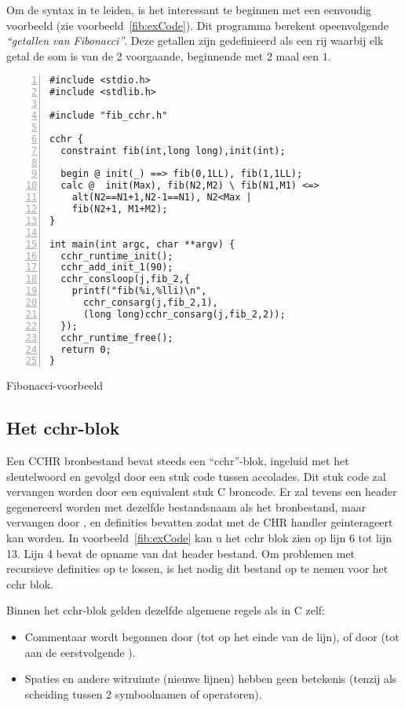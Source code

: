 Om de syntax in te leiden, is het interessant te beginnen met een eenvoudig voorbeeld (zie voorbeeld~\ref{fib:exCode}). Dit programma berekent opeenvolgende {\em ``getallen van Fibonacci''}. Deze getallen zijn gedefinieerd als een rij waarbij elk getal de som is van de 2 voorgaande, beginnende met 2 maal een $1$.

\begin{exCode}
\begin{Verbatim}[frame=single,numbers=left]
#include <stdio.h>
#include <stdlib.h>

#include "fib_cchr.h"

cchr {
  constraint fib(int,long long),init(int);

  begin @ init(_) ==> fib(0,1LL), fib(1,1LL);
  calc @  init(Max), fib(N2,M2) \ fib(N1,M1) <=>
    alt(N2==N1+1,N2-1==N1), N2<Max |
    fib(N2+1, M1+M2);
}

int main(int argc, char **argv) {
  cchr_runtime_init();
  cchr_add_init_1(90);
  cchr_consloop(j,fib_2,{
    printf("fib(%i,%lli)\n", 
      cchr_consarg(j,fib_2,1),
      (long long)cchr_consarg(j,fib_2,2));
  });
  cchr_runtime_free();
  return 0;
}
\end{Verbatim}
\caption{\label{fib:exCode} Fibonacci-voorbeeld}
\end{exCode}

\subsection{Het cchr-blok}

Een CCHR bronbestand bevat steeds een ``cchr''-blok, ingeluid met het sleutelwoord  en gevolgd door een stuk code tussen accolades. Dit stuk code zal vervangen worden door een equivalent stuk C broncode. Er zal tevens een header gegenereerd worden met dezelfde bestandsnaam als het bronbestand, maar  vervangen door , en definities bevatten zodat met de CHR handler geinterageert kan worden. In voorbeeld~\ref{fib:exCode} kan u het cchr blok zien op lijn 6 tot lijn 13. Lijn 4 bevat de opname van dat header bestand. Om problemen met recursieve definities op te lossen, is het nodig dit bestand op te nemen voor het cchr blok.

Binnen het cchr-blok gelden dezelfde algemene regels als in C zelf: \begin{itemize}
  \item Commentaar wordt begonnen door \code{//} (tot op het einde van de lijn), of door \code{/*} (tot aan de eerstvolgende \code{*/}).
  \item Spaties en andere witruimte (nieuwe lijnen) hebben geen betekenis (tenzij als scheiding tussen 2 symboolnamen of operatoren).
\end{itemize}

